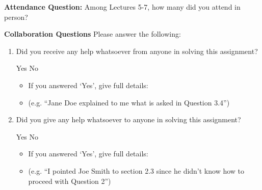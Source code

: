 \documentclass[11pt]{exam}
\numberwithin{equation}{section} %
\numberwithin{figure}{section} %
\numberwithin{table}{section} %
\begin{document}
\clearpage
\textbf{Attendance Question:} Among Lectures 5-7, how many did you attend in person?

\begin{tcolorbox}[fit,height=1cm,blank, borderline={1pt}{-2pt},nobeforeafter]
\end{tcolorbox}

\textbf{Collaboration Questions} Please answer the following:

\begin{enumerate}
    \item Did you receive any help whatsoever from anyone in solving this assignment?
          \begin{checkboxes}
              \choice Yes
              \choice No
          \end{checkboxes}
          \begin{itemize}
              \item If you answered `Yes', give full details:
              \item (e.g. “Jane Doe explained to me what is asked in Question 3.4”)
          \end{itemize}

          \begin{tcolorbox}[fit,height=3cm,blank, borderline={1pt}{-2pt},nobeforeafter]
          \end{tcolorbox}

    \item Did you give any help whatsoever to anyone in solving this assignment?
          \begin{checkboxes}
              \choice Yes
              \choice No
          \end{checkboxes}
          \begin{itemize}
              \item If you answered `Yes', give full details:
              \item (e.g. “I pointed Joe Smith to section 2.3 since he didn’t know how to proceed with Question 2”)
          \end{itemize}

          \begin{tcolorbox}[fit,height=3cm,blank, borderline={1pt}{-2pt},nobeforeafter]
          \end{tcolorbox}


\end{enumerate}
\end{document}
